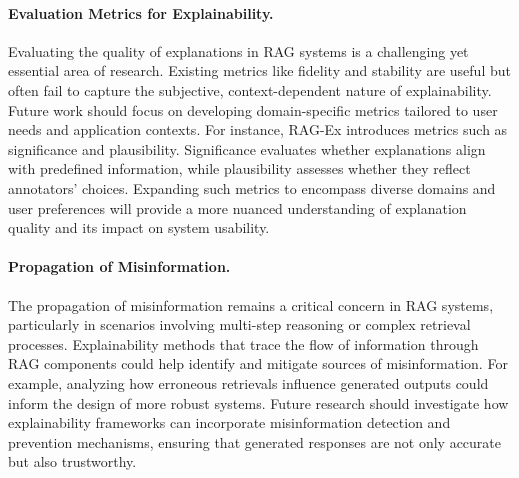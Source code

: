 \paragraph{Evaluation Metrics for Explainability.} Evaluating the quality of explanations in RAG systems is a challenging yet essential area of research. Existing metrics like fidelity and stability are useful but often fail to capture the subjective, context-dependent nature of explainability. Future work should focus on developing domain-specific metrics tailored to user needs and application contexts. For instance, RAG-Ex introduces metrics such as significance and plausibility. Significance evaluates whether explanations align with predefined information, while plausibility assesses whether they reflect annotators' choices. Expanding such metrics to encompass diverse domains and user preferences will provide a more nuanced understanding of explanation quality and its impact on system usability.

\paragraph{Propagation of Misinformation.} The propagation of misinformation remains a critical concern in RAG systems, particularly in scenarios involving multi-step reasoning or complex retrieval processes. Explainability methods that trace the flow of information through RAG components could help identify and mitigate sources of misinformation. For example, analyzing how erroneous retrievals influence generated outputs could inform the design of more robust systems. Future research should investigate how explainability frameworks can incorporate misinformation detection and prevention mechanisms, ensuring that generated responses are not only accurate but also trustworthy.